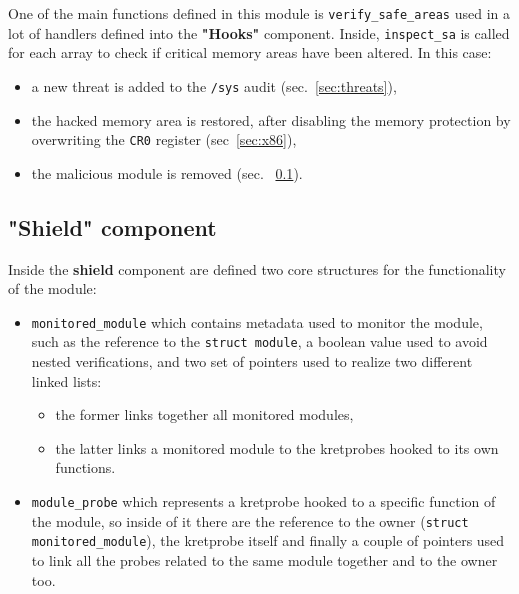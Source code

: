 \documentclass{article}
\begin{document}
	

	One of the main functions defined in this module is \texttt{verify\_safe\_areas} used in a lot of handlers defined
	into the \textbf{"Hooks"} component. Inside, \texttt{inspect\_sa} is called for each array to check if critical
	memory areas have been altered. In this case:

	\begin{itemize}
		\item a new threat is added to the \texttt{/sys} audit (sec.~\ref{sec:threats}),
		\item the hacked memory area is restored, after disabling the memory protection by overwriting the \texttt{CR0}
		register (sec~\ref{sec:x86}),
		\item the malicious module is removed (sec. ~\ref{sec:shield}).
	\end{itemize}

	\newpage
	\subsection{"Shield" component}\label{sec:shield}
	Inside the \textbf{shield} component are defined two core structures for the functionality of the module:
	\begin{itemize}
		\item \texttt{monitored\_module} which contains metadata used to monitor the module, such as the reference to
		the \texttt{struct module}, a boolean value used to avoid nested verifications, and two set of pointers used to
		realize two different linked lists:
		\begin{itemize}
			\item the former links together all monitored modules,
			\item the latter links a monitored module to the kretprobes hooked to its own functions.
		\end{itemize}

		\item \texttt{module\_probe} which represents a kretprobe hooked to a specific function of the module, so
		inside of it there are the reference to the owner (\texttt{struct monitored\_module}), the kretprobe itself and
		finally a couple of pointers used to link all the probes related to the same module together and to the owner
		too.
	\end{itemize}
\end{document}
